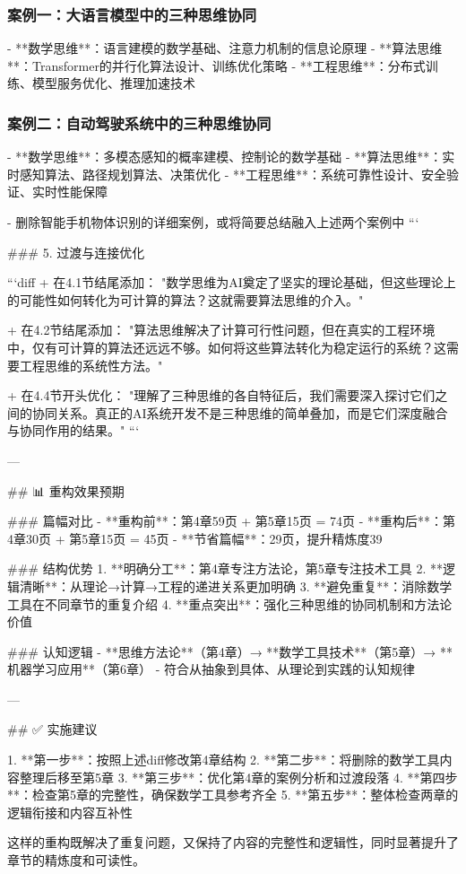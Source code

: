 \subsubsection{案例一：大语言模型中的三种思维协同}
- **数学思维**：语言建模的数学基础、注意力机制的信息论原理
- **算法思维**：Transformer的并行化算法设计、训练优化策略
- **工程思维**：分布式训练、模型服务优化、推理加速技术

\subsubsection{案例二：自动驾驶系统中的三种思维协同}
- **数学思维**：多模态感知的概率建模、控制论的数学基础
- **算法思维**：实时感知算法、路径规划算法、决策优化
- **工程思维**：系统可靠性设计、安全验证、实时性能保障

- 删除智能手机物体识别的详细案例，或将简要总结融入上述两个案例中
```

### 5. 过渡与连接优化

```diff
+ 在4.1节结尾添加：
"数学思维为AI奠定了坚实的理论基础，但这些理论上的可能性如何转化为可计算的算法？这就需要算法思维的介入。"

+ 在4.2节结尾添加：
"算法思维解决了计算可行性问题，但在真实的工程环境中，仅有可计算的算法还远远不够。如何将这些算法转化为稳定运行的系统？这需要工程思维的系统性方法。"

+ 在4.4节开头优化：
"理解了三种思维的各自特征后，我们需要深入探讨它们之间的协同关系。真正的AI系统开发不是三种思维的简单叠加，而是它们深度融合与协同作用的结果。"
```

---

## 📊 重构效果预期

### 篇幅对比
- **重构前**：第4章59页 + 第5章15页 = 74页
- **重构后**：第4章30页 + 第5章15页 = 45页
- **节省篇幅**：29页，提升精炼度39%

### 结构优势
1. **明确分工**：第4章专注方法论，第5章专注技术工具
2. **逻辑清晰**：从理论→计算→工程的递进关系更加明确
3. **避免重复**：消除数学工具在不同章节的重复介绍
4. **重点突出**：强化三种思维的协同机制和方法论价值

### 认知逻辑
- **思维方法论**（第4章）→ **数学工具技术**（第5章）→ **机器学习应用**（第6章）
- 符合从抽象到具体、从理论到实践的认知规律

---

## ✅ 实施建议

1. **第一步**：按照上述diff修改第4章结构
2. **第二步**：将删除的数学工具内容整理后移至第5章
3. **第三步**：优化第4章的案例分析和过渡段落
4. **第四步**：检查第5章的完整性，确保数学工具参考齐全
5. **第五步**：整体检查两章的逻辑衔接和内容互补性

这样的重构既解决了重复问题，又保持了内容的完整性和逻辑性，同时显著提升了章节的精炼度和可读性。